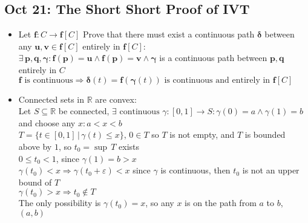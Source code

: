 \documentclass[10pt, oneside]{article}
\let\leq\leqslant
\newcommand{\R}{\mathbb{R}}
\renewcommand{\vec}[1]{\mathbf{#1}}
\newcommand{\vecf}[1]{\boldsymbol{#1}}
\begin{document}
\subsection{Oct 21: The Short Short Proof of IVT}
\begin{itemize}
    \item Let $\vecf{f} : C \rightarrow \vecf{f}[C]$ Prove that there must exist a continuous path $\vecf{\delta}$ between any $\vec{u}, \vec{v} \in \vecf{f}[C]$ entirely in $\vecf{f}[C]$:\\
        $\exists \, \vec{p}, \vec{q}, \vecf{\gamma} : \vecf{f}(\vec{p}) = \vec{u} \land \vecf{f}(\vec{p}) = \vec{v} \land \vecf{\gamma}$ is a continuous path between $\vec{p}, \vec{q}$ entirely in $C$\\
        $\vecf{f} \text{ is continuous} \Rightarrow \vecf{\delta} (t) = \vecf{f} (\vecf{\gamma}(t)) \text{ is continuous and entirely in } \vecf{f}[C]$
    \item Connected sets in $\R$ are convex:\\
        Let $S \subseteq \R$ be connected, $\exists \text{ continuous } \gamma : [0,1] \rightarrow S : \gamma(0) = a \land \gamma(1) = b$ and choose any $x : a < x < b$\\
        $T = \{t \in [0,1] \, | \, \gamma(t) \leq x\}$, $0 \in T$ so $T$ is not empty, and $T$ is bounded above by $1$, so $t_0 = \sup \, T$ exists\\
        $0 \leq t_0 < 1$, since $\gamma(1) = b > x$\\
        $\gamma(t_0) < x \Rightarrow \gamma(t_0 + \varepsilon) < x$ since $\gamma$ is continuous, then $t_0$ is not an upper bound of $T$\\
        $\gamma(t_0) > x \Rightarrow t_0 \notin T$\\
        The only possibility is $\gamma(t_0) = x$, so any $x$ is on the path from $a$ to $b$, $(a,b)$
\end{itemize}
\end{document}
